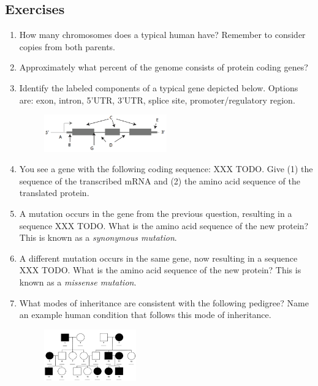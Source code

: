 \documentclass[12pt]{article}
\begin{document}
\subsection*{Exercises}
\begin{enumerate}

\item How many chromosomes does a typical human have? Remember to consider copies from both parents.

\item Approximately what percent of the genome consists of protein coding genes?

\item Identify the labeled components of a typical gene depicted below. Options are: exon, intron, 5'UTR, 3'UTR, splice site, promoter/regulatory region.
\begin{figure}[h!]
\centering
\includegraphics[width=200px]{pset1gene.png}
\end{figure}

\item You see a gene with the following coding sequence: XXX TODO. Give (1) the sequence of the transcribed mRNA and (2) the amino acid sequence of the translated protein.

\item A mutation occurs in the gene from the previous question, resulting in a sequence XXX TODO. What is the amino acid sequence of the new protein? This is known as a \emph{synonymous mutation}.

\item A different mutation occurs in the same gene, now resulting in a sequence XXX TODO. What is the amino acid sequence of the new protein? This is known as a \emph{missense mutation}.

\item What modes of inheritance are consistent with the following pedigree? Name an example human condition that follows this mode of inheritance.
\begin{figure}[h!]
\centering
\includegraphics[width=150px]{pset1recessive.png}
\end{figure}


\end{enumerate}
\end{document}
